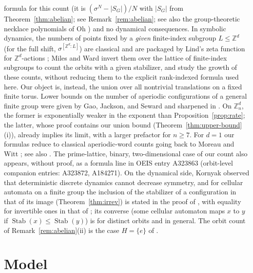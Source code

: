 \documentclass[11pt,a4paper]{article}
\theoremstyle{remark}
\DeclareMathOperator{\Stab}{Stab}
\newcommand{\ZZ}{\mathbb{Z}}
\begin{document}
formula for this count (it is $(\sigma^N-|S_G|)/N$ with $|S_G|$ from
Theorem~\ref{thm:abelian}; see Remark~\ref{rem:abelian}; see also the
group-theoretic necklace polynomials of Oh \cite{oh2012}) and no dynamical
consequences. In symbolic dynamics, the numbers of points fixed by a
\emph{given} finite-index subgroup $L\le\ZZ^d$ (for the full shift,
$\sigma^{[\ZZ^d:L]}$) are classical and are packaged by Lind's zeta function
for $\ZZ^d$-actions \cite{lind1996}; Miles and Ward \cite{mw2009} invert
them over the lattice of finite-index subgroups to count the orbits with a
given stabilizer, and study the growth of these counts, without reducing
them to the explicit rank-indexed formula used here. Our object is, instead, the union over all nontrivial
translations on a fixed finite torus. Lower
bounds on the number of aperiodic configurations of a general finite group
were given by Gao, Jackson, and Seward \cite[Cor.~1.7.2]{gjs2016} and
sharpened in \cite[Thm.~5]{cg2017}. On $\ZZ_n^d$, the former is
exponentially weaker in the exponent than Proposition~\ref{prop:rate};
the latter, whose proof contains our union bound
(Theorem~\ref{thm:upper-bound}(i)), already implies its limit, with a
larger prefactor for $n\ge7$. For
$d=1$ our formulas reduce to classical aperiodic-word counts going back to
Moreau and Witt \cite{moreau1872,witt1937}; see also
\cite{metropolisrota1983}. The prime-lattice, binary, two-dimensional case
of our count also appears, without proof, as a formula line in OEIS entry
A323863 \cite{oeisA323863} (orbit-level companion entries: A323872,
A184271). On the dynamical side,
Kornyak \cite{kornyak2010} observed that deterministic discrete dynamics
cannot decrease symmetry, and for cellular automata on a finite group the
inclusion of the stabilizer of a configuration in that of its image
(Theorem~\ref{thm:irrev}) is stated in the proof of \cite[Lemma~10]{cg2017},
with equality for invertible ones in that of \cite[Lemma~3]{cg2017}; its
converse (some cellular automaton maps $x$ to $y$ if $\Stab(x)\le\Stab(y)$)
is \cite[Lemma~10]{cg2017} for distinct orbits and \cite[Thm.~2(iii)]{cgvn2017}
in general. The orbit count of Remark~\ref{rem:abelian}(ii) is the case
$H=\{e\}$ of \cite[Lemma~4]{cg2017}.

\section{Model}\label{sec:model}
\end{document}
